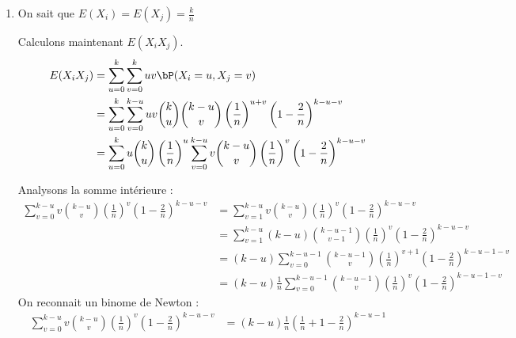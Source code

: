 \begin{correction}
\begin{enumerate}
\item 
On sait que $E(X_i) =E(X_j)=\frac{k}{n}$

Calculons maintenant $E(X_iX_j)$. 
\begin{align*}
E(X_iX_j) &= \sum_{u=0}^k\sum_{v=0}^k uv \bP(X_i=u, X_j =v)\\
			&=  \sum_{u=0}^k \sum_{v=0}^{k-u} uv \binom{k}{u}\binom{k-u}{v} \left(\frac{1}{n}\right)^{u+v} \left(1-\frac{2}{n}\right)^{k-u-v}\\
			&=\sum_{u=0}^k u \binom{k}{u} \left(\frac{1}{n}\right)^{u}  \sum_{v=0}^{k-u} v \binom{k-u}{v} \left(\frac{1}{n}\right)^{v} \left(1-\frac{2}{n}\right)^{k-u-v} \\
\end{align*}

Analysons la  somme  intérieure : 
\begin{align*}
\sum_{v=0}^{k-u} v \binom{k-u}{v} \left(\frac{1}{n}\right)^{v} \left(1-\frac{2}{n}\right)^{k-u-v} &=
\sum_{v=1}^{k-u} v \binom{k-u}{v} \left(\frac{1}{n}\right)^{v} \left(1-\frac{2}{n}\right)^{k-u-v} \\
&= \sum_{v=1}^{k-u} (k-u) \binom{k-u-1}{v-1} \left(\frac{1}{n}\right)^{v} \left(1-\frac{2}{n}\right)^{k-u-v}\\
&= (k-u) \sum_{v=0}^{k-u-1} \binom{k-u-1}{v} \left(\frac{1}{n}\right)^{v+1} \left(1-\frac{2}{n}\right)^{k-u-1-v}\\
&= (k-u)\frac{1}{n} \sum_{v=0}^{k-u-1} \binom{k-u-1}{v} \left(\frac{1}{n}\right)^{v} \left(1-\frac{2}{n}\right)^{k-u-1-v}
\end{align*}
On reconnait un binome de Newton : 
\begin{align*}
\sum_{v=0}^{k-u} v \binom{k-u}{v} \left(\frac{1}{n}\right)^{v} \left(1-\frac{2}{n}\right)^{k-u-v}&=
(k-u) \frac{1}{n}  \left(\frac{1}{n}+1-\frac{2}{n}\right)^{k-u-1}
\end{align*}


\end{enumerate}
\end{correction}

